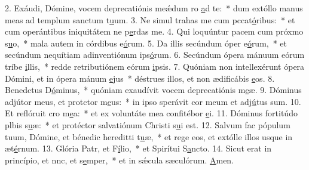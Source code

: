 2. Exáudi, Dómine, vocem deprecatiónis meǽdum ro \uline{a}d te:~* dum extóllo manus meas ad templum sanctum t\uline{u}um.
3. Ne simul trahas me cum pccat\uline{ó}ribus:~* et cum operántibus iniquitátem ne p\uline{e}rdas me.
4. Qui loquúntur pacem cum próxmo s\uline{u}o,~* mala autem in córdibus e\uline{ó}rum.
5. Da illis secúndum óper e\uline{ó}rum,~* et secúndum nequítiam adinventiónum ips\uline{ó}rum.
6. Secúndum ópera mánuum eórum tríbe \uline{i}llis,~* redde retributiónem eórum \uline{i}psis.
7. Quóniam non intellexérunt ópera Dómini, et in ópera mánum \uline{e}jus~* déstrues illos, et non ædificábis \uline{e}os.
8. Benedctus D\uline{ó}minus,~* quóniam exaudívit vocem deprecatiónis m\uline{e}æ.
9. Dóminus adjútor meus, et protctor m\uline{e}us:~* in ipso sperávit cor meum et adj\uline{ú}tus sum.
10. Et reflóruit cro m\uline{e}a:~* et ex voluntáte mea confitébor \uline{e}i.
11. Dóminus fortitúdo plbis s\uline{u}æ:~* et protéctor salvatiónum Christi s\uline{u}i est.
12. Salvum fac pópulum tuum, Dómine, et bénedic hereditti t\uline{u}æ,~* et rege eos, et extólle illos usque in æt\uline{é}rnum.
13. Glória Patr, et F\uline{í}lio,~* et Spirítui S\uline{a}ncto.
14. Sicut erat in princípio, et nnc, et s\uline{e}mper,~* et in sǽcula sæculórum. \uline{A}men.
